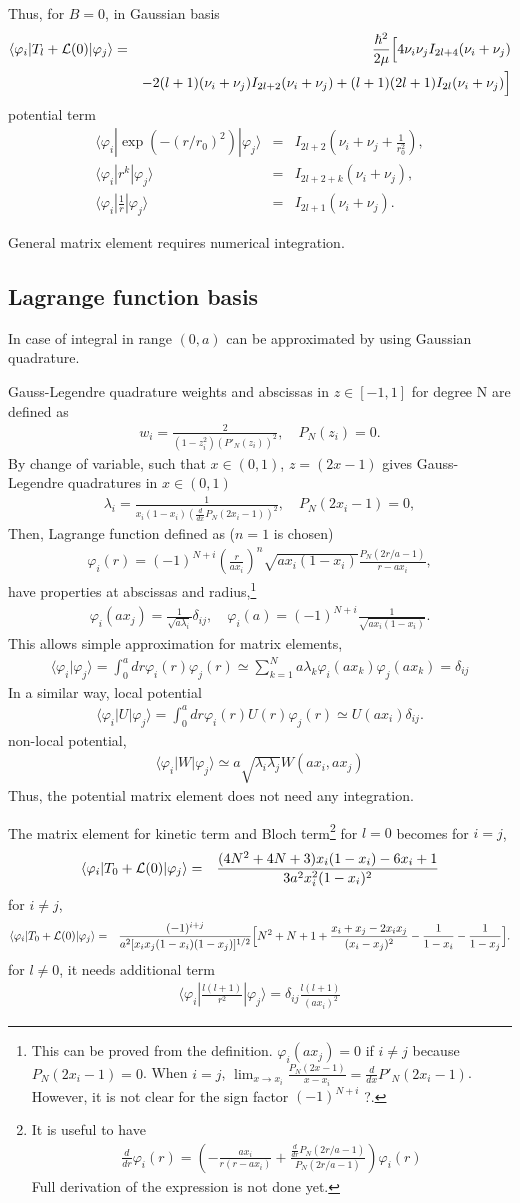 \documentclass[11pt]{book}
\def\la{\langle}
\def\ra{\rangle}
\newcommand{\bea}{\begin{eqnarray}}
\newcommand{\eea}{\end{eqnarray}}
\newcommand{\no}{\nonumber \\}
\begin{document}
Thus, for $B=0$, in Gaussian basis
\bea 
\la \varphi_i|T_l+{\cal L}(0)|\varphi_j\ra 
&=& \frac{\hbar^2}{2\mu}  \Big[ 4 \nu_i \nu_j I_{2l+4}(\nu_i+\nu_j) 
 \no & & 
     - 2(l+1)(\nu_i+\nu_j) I_{2l+2}(\nu_i+\nu_j)
     +(l+1)(2l+1) I_{2l}(\nu_i+\nu_j)\Big] 
\eea 
 potential term 
\bea 
\la \varphi_i| \exp(-(r/r_0)^2)|\varphi_j\ra &=& I_{2l+2}(\nu_i+\nu_j+\frac{1}{r_0^2}),\no 
\la \varphi_i| r^k |\varphi_j\ra &=& I_{2l+2+k}(\nu_i+\nu_j),\no 
\la \varphi_i| \frac{1}{r}|\varphi_j\ra &=& I_{2l+1}(\nu_i+\nu_j).
\eea 

General matrix element requires numerical integration. 

\subsection{Lagrange function basis}
In case of integral in range $(0,a)$ can be approximated by using Gaussian quadrature. 

Gauss-Legendre quadrature weights and abscissas in $z \in [-1,1]$ for degree N are defined as
\bea 
w_i =\frac{2}{(1-z_i^2) (P'_N(z_i))^2 }, \quad P_N(z_i)=0. 
\eea  
By change of variable, such that $x\in (0,1)$, $z=(2x-1)$ gives
Gauss-Legendre quadratures in $x\in (0,1)$
\bea 
\lambda_i =\frac{1}{x_i(1-x_i)( \frac{d}{dx} P_N(2x_i-1))^2 }        ,\quad P_N(2x_i-1)=0,
\eea 
Then, Lagrange function defined as ($n=1$ is chosen)
\bea 
\varphi_i(r)=(-1)^{N+i}\left( \frac{r}{ax_i}\right)^n \sqrt{ax_i(1-x_i)} \frac{ P_N(2r/a-1)}{r-ax_i},
\eea 
have properties at abscissas and radius,\footnote{
This can be proved from the definition. $\varphi_i(ax_j)=0$ if $i\neq j$ because $P_N(2x_i-1)=0$.
When $i=j$, $\lim_{x\to x_i}\frac{P_N(2x-1)}{x-x_i} = \frac{d}{dx} P'_N(2x_i-1) $.
However, it is not clear for the sign factor $(-1)^{N+i}$ ?. 
} 
\bea 
\varphi_i(ax_j)= \frac{1}{\sqrt{a\lambda_i}} \delta_{ij},\quad \varphi_i(a)=(-1)^{N+i}\frac{1}{\sqrt{a x_i(1-x_i)}}.
\eea 
This allows simple approximation for matrix elements,
\bea 
\la \varphi_i|\varphi_j\ra =\int_0^a dr \varphi_i(r) \varphi_j(r) \simeq \sum_{k=1}^N a \lambda_k \varphi_i(ax_k) \varphi_j(ax_k) 
                                    =\delta_{ij}
\eea 
In a similar way, local potential
\bea 
\la \varphi_i|U|\varphi_j\ra =\int_0^a dr \varphi_i(r) U(r) \varphi_j(r) \simeq U(ax_i)\delta_{ij}.
\eea 
non-local potential,
\bea 
\la \varphi_i|W|\varphi_j\ra \simeq a\sqrt{\lambda_i\lambda_j}W(ax_i,ax_j)
\eea 
Thus, the potential matrix element does not need any integration. 

The matrix element for kinetic term and Bloch term\footnote{ 
	It is useful to have
	\bea
	\frac{d}{dr}\varphi_i(r)=\left(-\frac{a x_i}{r(r-ax_i)}+  \frac{\frac{d}{dr}P_N(2r/a-1)}{P_N(2r/a-1)} \right)
	\varphi_i(r) 
	\eea  
	Full derivation of the expression is not done yet. 
}
for $l=0$ becomes
for $i=j$,
\bea 
\la \varphi_i| T_0 +{\cal L}(0)|\varphi_j\ra &=& 
 \frac{ (4N^2+4N+3)x_i(1-x_i)-6x_i+1}{3a^2 x_i^2(1-x_i)^2}  
\eea 
for $i\neq j$,
\bea 
\la \varphi_i|T_0+{\cal L}(0)|\varphi_j\ra 
&=& \frac{(-1)^{i+j}}{a^2[x_i x_j(1-x_i)(1-x_j)]^{1/2}}
    \Big[ N^2+N+1+\frac{x_i+x_j-2x_i x_j}{(x_i-x_j)^2}
      -\frac{1}{1-x_i}-\frac{1}{1-x_j}\Big].
\eea 
for $l\neq 0$, it needs additional term
\bea 
\la \varphi_i|\frac{l(l+1)}{r^2}|\varphi_j\ra =\delta_{ij} \frac{l(l+1)}{(a x_i)^2}
\eea 
\end{document}
